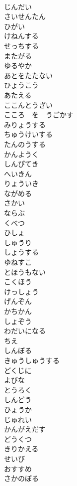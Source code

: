 \documentclass[8pt]{extreport}
\begin{document}
\begin{CJK}{UTF8}{min}
\\	じんだい
\\	さいせんたん
\\	ひがい
\\	けねんする
\\	せっちする
\\	またがる
\\	ゆるやか
\\	あとをたたない
\\	ひょうこう
\\	あたえる
\\	ここんとうざい
\\	こころ　を　うごかす
\\	みりょうする
\\	ちゅうけいする
\\	たんのうする
\\	かんようく
\\	しんぴてき
\\	へいきん
\\	りょういき
\\	ながめる
\\	さかい
\\	ならぶ
\\	くべつ
\\	ひしょ
\\	しゅうり
\\	しょうする
\\	ゆねすこ
\\	とほうもない
\\	こくほう
\\	けっしょう
\\	げんぞん
\\	かちかん
\\	しょぞう
\\	わだいになる
\\	ちえ
\\	しんぼる
\\	きゅうしゅうする
\\	どくじに
\\	よびな
\\	とうろく
\\	しんどう
\\	ひょうか
\\	じゅれい
\\	かんがえだす
\\	どうくつ
\\	きりかえる
\\	せいび
\\	おすすめ
\\	さかのぼる

\end{CJK}
\end{document}
